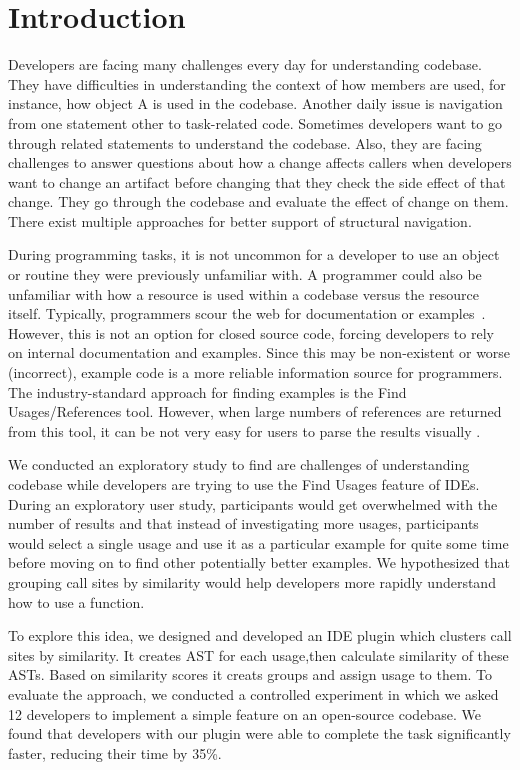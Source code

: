 \documentclass[conference]{IEEEtran}
\begin{document}
\section{Introduction}
Developers are facing many challenges every day for understanding codebase. They have difficulties in understanding the context of how members are used, for instance, how object A is used in the codebase. Another daily issue is navigation from one statement other to task-related code. Sometimes developers want to go through related statements to understand the codebase. Also, they are facing challenges to answer questions about how a change affects callers when developers want to change an artifact before changing that they check the side effect of that change. They go through the codebase and evaluate the effect of change on them. There exist multiple approaches for better support of structural navigation.\par
During programming tasks, it is not uncommon for a developer to use an object or routine they were previously unfamiliar with. A programmer could also be unfamiliar with how a resource is used within a codebase versus the resource itself. Typically, programmers scour the web for documentation or examples~\cite{brandt2009two}. However, this is not an option for closed source code, forcing developers to rely on internal documentation and examples. Since this may be non-existent or worse (incorrect), example code is a more reliable information source for programmers. The industry-standard approach for finding examples is the Find Usages/References tool. However, when large numbers of references are returned from this tool, it can be not very easy for users to parse the results visually .\par
We conducted an exploratory study to find are challenges of understanding codebase while developers are trying to use the Find Usages feature of IDEs. During an exploratory user study, participants would get overwhelmed with the number of results and that instead of investigating more usages, participants would select a single usage and use it as a particular example for quite some time before moving on to find other potentially better examples.
We hypothesized that grouping call sites by similarity would help developers more rapidly understand how to use a function. \par

To explore this idea, we designed and developed an IDE plugin which clusters call sites by similarity. It creates AST for each usage,then calculate similarity of these ASTs. Based on similarity scores it creats groups and assign usage to them. 
To evaluate the approach, we conducted  a  controlled  experiment  in which we asked 12 developers to implement a simple feature on an open-source codebase. We found that developers with our plugin were able to complete the task significantly faster, reducing their time by 35\%.\par
\end{document}
